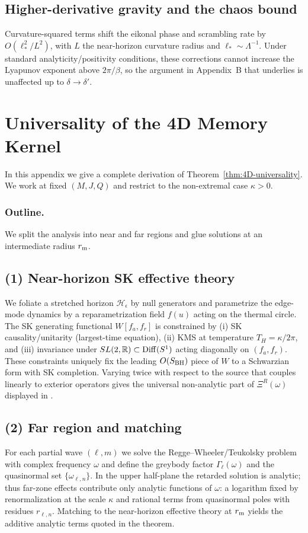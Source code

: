 \documentclass[aps,prd,preprint,onecolumn,superscriptaddress,nofootinbib,longbibliography,floatfix,11pt,showpacs,showkeys]{revtex4-2}
\theoremstyle{plain}
\theoremstyle{definition}
\theoremstyle{remark}
\begin{document}
\subsection{Higher-derivative gravity and the chaos bound}
Curvature-squared terms shift the eikonal phase and scrambling rate by $O(\ell_\ast^2/L^2)$, with $L$ the near-horizon curvature radius and $\ell_\ast\sim \Lambda^{-1}$.
Under standard analyticity/positivity conditions, these corrections cannot increase the Lyapunov exponent above $2\pi/\beta$, so the argument in Appendix~B that underlies  is unaffected up to $\delta\to\delta'$.

\section{Universality of the 4D Memory Kernel}
\label{app:4D_universality} %
In this appendix we give a complete derivation of Theorem~\ref{thm:4D-universality}. We work at fixed $(M,J,Q)$ and restrict to the non-extremal case $\kappa>0$.

\subsubsection{Outline.} We split the analysis into near and far regions and glue solutions at an intermediate radius $r_{\rm m}$.

\subsection*{(1) Near-horizon SK effective theory}
We foliate a stretched horizon $\mathcal{H}_\epsilon$ by null generators and parametrize the edge-mode dynamics by a reparametrization field $f(u)$ acting on the thermal circle. The SK generating functional $W[f_a,f_r]$ is constrained by (i) SK causality/unitarity (largest-time equation), (ii) KMS at temperature $T_H=\kappa/2\pi$, and (iii) invariance under $SL(2,\mathbb{R})\subset{\rm Diff}(S^1)$ acting diagonally on $(f_a,f_r)$. These constraints uniquely fix the leading $O(S_{\rm BH})$ piece of $W$ to a Schwarzian form with SK completion. Varying twice with respect to the source that couples linearly to exterior operators gives the universal non-analytic part of $\Xi^R(\omega)$ displayed in .

\subsection*{(2) Far region and matching}
For each partial wave $(\ell,m)$ we solve the Regge--Wheeler/Teukolsky problem with complex frequency $\omega$ and define the greybody factor $\Gamma_\ell(\omega)$ and the quasinormal set $\{\omega_{\ell,n}\}$. In the upper half-plane the retarded solution is analytic; thus far-zone effects contribute only analytic functions of $\omega$: a logarithm fixed by renormalization at the scale $\kappa$ and rational terms from quasinormal poles with residues $r_{\ell,n}$. Matching to the near-horizon effective theory at $r_{\rm m}$ yields the additive analytic terms quoted in the theorem.
\end{document}

